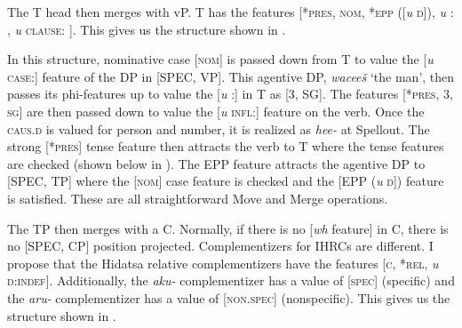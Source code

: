 \documentclass[output=paper]{LSP/langsci}
\begin{document}
The T head then merges with vP. T has the features [\textsc{*pres, nom, *epp} ([\textit{u} \textsc{d}]), \textit{u} : , \textit{u} \textsc{clause}: ]. This gives us the structure shown in .

\ea \label{boyle35}
{\hspace{1em}}\newline

\z

In this structure, nominative case [\textsc{nom}] is passed down from T to value the [\textit{u} \textsc{case}:] feature of the DP in [SPEC, VP]. This agentive DP, \textit{wacee\v{s}} `the man', then passes its phi-features up to value the [\textit{u} :] in T as [3, SG].  The features [*\textsc{pres, 3, sg}] are then passed down to value the [\textit{u} \textsc{infl}:] feature on the verb. Once the \textsc{caus.d} is valued for person and number, it is realized as \textit{hee-} at Spellout. The strong [*\textsc{pres}] tense feature then attracts the verb to T where the tense features are checked (shown below in ). The EPP feature attracts the agentive DP to [SPEC, TP] where the [\textsc{nom}] case feature is checked and the [EPP (\textit{u} \textsc{d}]) feature is satisfied. These are all straightforward Move and Merge operations.
	
The TP then merges with a C. Normally, if there is no [\textit{wh} feature] in C, there is no [SPEC, CP] position projected. Complementizers for IHRCs are different.  I propose that the Hidatsa relative complementizers have the features [\textsc{c, *rel,} \textit{u} \textsc{d:indef}].  Additionally, the \textit{aku-} complementizer has a value of [\textsc{spec}] (specific) and the \textit{aru-} complementizer has a value of [\textsc{non.spec}] (nonspecific). This gives us the structure shown in .
\end{document}
